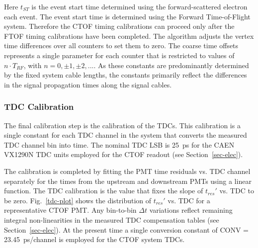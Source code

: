 \documentclass{elsart}
\begin{document}
\noindent
Here $t_{ST}$ is the event start time determined using the forward-scattered electron each event. The
event start time is determined using the Forward Time-of-Flight system. Therefore the CTOF timing
calibrations can proceed only after the FTOF timing calibrations have been completed. The algorithm
adjusts the vertex time differences over all counters to set them to zero. The coarse time offsets
represents a single parameter for each counter that is restricted to values of $n \cdot T_{RF}$, with
$n = 0, \pm 1, \pm 2, ...$. As these constants are predominantly determined by the fixed system cable
lengths, the constants primarily reflect the differences in the signal propagation times along the signal
cables.

\subsubsection{TDC Calibration}
\label{sec-tdccal}

The final calibration step is the calibration of the TDCs. This calibration is a single constant for each
TDC channel in the system that converts the measured TDC channel bin into time. The nominal TDC
LSB is 25~ps for the CAEN VX1290N TDC units employed for the CTOF readout (see
Section~\ref{sec-elec}).

The calibration is completed by fitting the PMT time residuals vs. TDC channel separately for the times
from the upstream and downstream PMTs using a linear function. The TDC calibration is the value that
fixes the slope of $t_{res}'$ vs. TDC to be zero. Fig.~\ref{tdc-plot} shows the distribution of $t_{res}'$
vs. TDC for a representative CTOF PMT. Any bin-to-bin $\Delta t$ variations reflect remaining integral
non-linearities in the measured TDC compensation tables (see Section~\ref{sec-elec}). At the present
time a single conversion constant of CONV = 23.45~ps/channel is employed for the CTOF system TDCs.
\end{document}
